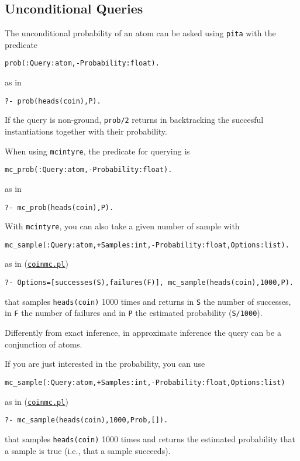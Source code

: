 \subsection{Unconditional Queries}
\label{uncondq}
The unconditional probability of an atom can be asked using \verb|pita| with the predicate
\begin{verbatim}
prob(:Query:atom,-Probability:float).
\end{verbatim}
as in
\begin{verbatim}
?- prob(heads(coin),P).
\end{verbatim}
If the query is non-ground, \verb|prob/2| returns in backtracking the succesful instantiations together with their probability.

When using \verb|mcintyre|, the predicate for querying is
\begin{verbatim}
mc_prob(:Query:atom,-Probability:float).
\end{verbatim} as in
\begin{verbatim}
?- mc_prob(heads(coin),P).
\end{verbatim}
With \verb|mcintyre|, you can also take a given number of sample with
\begin{verbatim}
mc_sample(:Query:atom,+Samples:int,-Probability:float,Options:list).
\end{verbatim}
as in (\href{http://cplint.ml.unife.it/example/inference/coinmc.pl}{\texttt{coinmc.pl}})
\begin{verbatim}
?- Options=[successes(S),failures(F)], mc_sample(heads(coin),1000,P).
\end{verbatim}
that samples \verb|heads(coin)| 1000 times and returns in \verb|S| the number of successes, in \verb|F| the number of failures and in \verb|P| the
estimated probability (\verb|S/1000|).

Differently from exact inference, in approximate inference the query can be a conjunction of atoms.

If you are just interested in the probability, you can use
\begin{verbatim}
mc_sample(:Query:atom,+Samples:int,-Probability:float,Options:list)
\end{verbatim}
as in (\href{http://cplint.ml.unife.it/example/inference/coinmc.pl}{\texttt{coinmc.pl}})
\begin{verbatim}
?- mc_sample(heads(coin),1000,Prob,[]).
\end{verbatim}
that samples \verb|heads(coin)| 1000 times and returns the
estimated probability that a sample is true (i.e., that a sample succeeds).


